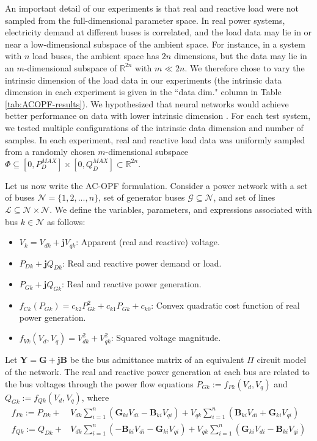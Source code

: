\documentclass[10pt]{article} %
\theoremstyle{plain}
\theoremstyle{definition}
\theoremstyle{remark}
\begin{document}
An important detail of our experiments is that real and reactive load were not sampled from the full-dimensional parameter space. In real power systems, electricity demand at different buses is correlated, and the load data may lie in or near a low-dimensional subspace of the ambient space. For instance, in a system with $n$ load buses, the ambient space has $2n$ dimensions, but the data may lie in an $m$-dimensional subspace of $\mathbb{R}^{2n}$ with $m \ll 2n$. We therefore chose to vary the intrinsic dimension of the load data in our experiments (the intrinsic data dimension in each experiment is given in the ``data dim." column in Table \ref{tab:ACOPF-results}). We hypothesized that neural networks would achieve better performance on data with lower intrinsic dimension . For each test system, we tested multiple configurations of the intrinsic data dimension and number of samples. In each experiment, real and reactive load data was uniformly sampled from a randomly chosen $m$-dimensional subspace $\Phi \subseteq [0, P^{MAX}_D] \times [0, Q^{MAX}_D] \subset \mathbb{R}^{2n}$.

Let us now write the AC-OPF formulation. Consider a power network with a set of buses $\mathcal{N} = \{1, 2, ..., n\}$, set of generator buses $\mathcal{G} \subseteq \mathcal{N}$, and set of lines $\mathcal{L} \subseteq \mathcal{N} \times \mathcal{N}$. We define the variables, parameters, and expressions associated with bus $k \in \mathcal{N}$ as follows:
\begin{itemize}[itemsep=2pt, topsep=0pt, parsep=0pt, partopsep=0pt]
    \item $V_k = V_{dk} +\mathbf{j} V_{qk}$: Apparent (real and reactive) voltage.
    \item $P_{Dk} + \mathbf{j} Q_{Dk}$: Real and reactive power demand or load.
    \item $P_{Gk} + \mathbf{j} Q_{Gk}$: Real and reactive power generation.
    \item $f_{Ck}(P_{Gk}) = c_{k2} P_{Gk}^2 + c_{k1} P_{Gk} + c_{k0}$: Convex quadratic cost function of real power generation.
    \item $f_{Vk}(V_d, V_q) = V_{dk}^2 + V_{qk}^2$: Squared voltage magnitude.
\end{itemize}

Let $\mathbf{Y} = \mathbf{G} + \mathbf{jB}$ be the bus admittance matrix of an equivalent $\Pi$ circuit model of the network.
The real and reactive power generation at each bus are related to the bus voltages through the power flow equations $P_{Gk} := f_{Pk}(V_d, V_q)$ and $Q_{Gk} := f_{Qk}(V_d, V_q)$, where
{
\setlength{\abovedisplayskip}{1pt}
\setlength{\belowdisplayskip}{3pt}
\setlength{\jot}{0pt}
\setlength{\arraycolsep}{3pt}
\begin{align}
    f_{Pk} :=  P_{Dk} + &V_{dk} \sum_{i=1}^{n}(\mathbf{G}_{ki} V_{di} - \mathbf{B}_{ki} V_{qi})
    + V_{qk} \sum_{i=1}^n (\mathbf{B}_{ki} V_{di} + \mathbf{G}_{ki} V_{qi}) \label{eq:active-power-flow}\\
    f_{Qk} := Q_{Dk} + &V_{dk}\sum_{i=1}^{n}(-\mathbf{B}_{ki} V_{di} - \mathbf{G}_{ki} V_{qi})
    + V_{qk} \sum_{i=1}^n (\mathbf{G}_{ki} V_{di} - \mathbf{B}_{ki} V_{qi}) \label{eq:reactive-power-flow}
\end{align}
}
\end{document}

